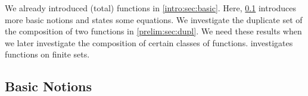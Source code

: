 
We already introduced (total) functions  in \cref{intro:sec:basic}. 
Here, \cref{prelim:subsec:func:basic} introduces more basic notions and states some equations.
We investigate the duplicate set of the composition of two functions
in \cref{prelim:sec:dupl}. We need these results when we later investigate the composition
of certain classes of functions.
 investigates functions on finite sets.

\subsection{Basic Notions} 
\label{prelim:subsec:func:basic}

